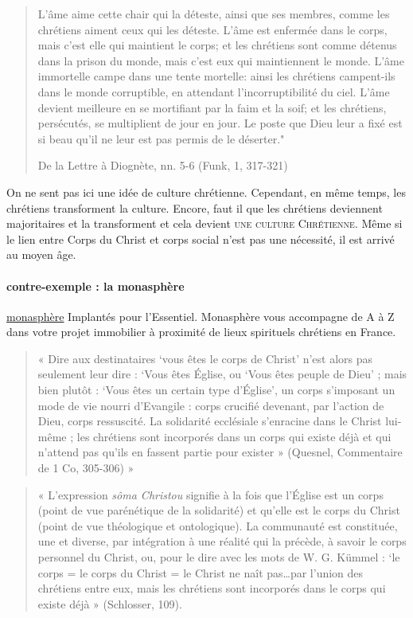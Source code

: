 \begin{quote}
L’âme aime cette chair qui la déteste, ainsi que ses membres, comme les chrétiens aiment ceux qui les déteste. L’âme est enfermée dans le corps, mais c’est elle qui maintient le corps; et les chrétiens sont comme détenus dans la prison du monde, mais c’est eux qui maintiennent le monde. L’âme immortelle campe dans une tente mortelle: ainsi les chrétiens campent-ils dans le monde corruptible, en attendant l’incorruptibilité du ciel. L’âme devient meilleure en se mortifiant par la faim et la soif; et les chrétiens, persécutés, se multiplient de jour en jour. Le poste que Dieu leur a fixé est si beau qu’il ne leur est pas permis de le déserter."

De la Lettre à Diognète, nn. 5-6 (Funk, 1, 317-321)

\end{quote}

On ne sent pas ici une idée de culture chrétienne. Cependant, en même temps, les chrétiens transforment la culture. Encore, faut il que les chrétiens deviennent majoritaires et la transforment et cela devient \textsc{une culture Chrétienne}. Même si le lien entre Corps du Christ et corps social n'est pas une nécessité, il est arrivé au moyen âge.

\paragraph{contre-exemple : la monasphère} \href{https://monasphere.fr/}{monasphère} Implantés pour l’Essentiel.
Monasphère vous accompagne de A à Z dans votre projet immobilier à proximité de lieux spirituels chrétiens en France.


\begin{quote}
    « Dire aux destinataires ‘vous êtes le corps de Christ’ n’est alors pas seulement leur dire : ‘Vous êtes Église, ou ‘Vous êtes peuple de Dieu’ ; mais bien plutôt : ‘Vous êtes un certain type d’Église’, un corps s’imposant un mode de vie nourri d’Evangile : corps crucifié devenant, par l’action de Dieu, corps ressuscité. La solidarité ecclésiale s’enracine dans le Christ lui-même ; les chrétiens sont incorporés dans un corps qui existe déjà et qui n’attend pas qu’ils en fassent partie pour exister » (Quesnel, Commentaire de 1 Co, 305-306) » 
\end{quote}
\begin{quote}
     « L’expression \emph{sôma Christou} signifie à la fois que l’Église est un corps (point de vue parénétique de la solidarité) et qu’elle est le corps du Christ (point de vue théologique et ontologique). La communauté est constituée, une et diverse, par intégration à une réalité qui la précède, à savoir le corps personnel du Christ, ou, pour le dire avec les mots de W. G. Kümmel : ‘le corps = le corps du Christ = le Christ ne naît pas…par l’union des chrétiens entre eux, mais les chrétiens sont incorporés dans le corps qui existe déjà » (Schlosser, 109). 
\end{quote}
